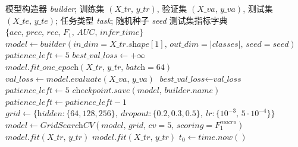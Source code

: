 \begin{algorithm}
  \caption{模型训练与评估循环}
  \label{alg:train-evaluate}
  \small
  \begin{algorithmic}
    \REQUIRE 模型构造器 \textit{builder}; 训练集 $(\textit{X\_tr},\, \textit{y\_tr})$,
             验证集 $(\textit{X\_va},\, \textit{y\_va})$,
             测试集 $(\textit{X\_te},\, \textit{y\_te})$; 任务类型 \textit{task}; 随机种子 \textit{seed}
    \ENSURE 测试集指标字典 $\{\textit{acc},\, \textit{prec},\, \textit{rec},\, F_1,\, \textit{AUC},\, \textit{infer\_time}\}$
    \STATE {}
    \STATE $\textit{model} \gets \textit{builder}(\textit{in\_dim}=\textit{X\_tr}.\textit{shape}[1],\, \textit{out\_dim}=|\textit{classes}|,\, \textit{seed}=\textit{seed})$
      \STATE {}
      \STATE $\textit{patience\_left} \gets 5$
      \STATE $\textit{best\_val\_loss} \gets +\infty$
        \STATE $\textit{model.fit\_one\_epoch}(\textit{X\_tr},\, \textit{y\_tr},\, \textit{batch}=64)$
        \STATE $\textit{val\_loss} \gets \textit{model.evaluate}(\textit{X\_va},\, \textit{y\_va})$
          \STATE $\textit{best\_val\_loss} \gets \textit{val\_loss}$
          \STATE $\textit{patience\_left} \gets 5$
          \STATE $\textit{checkpoint.save}(\textit{model},\, \textit{builder.name})$
        \ELSE
          \STATE $\textit{patience\_left} \gets \textit{patience\_left} - 1$
        \ENDIF
      \ENDWHILE
    \ELSE
        \STATE {}
        \STATE $\textit{grid} \gets \{\textit{hidden}\!:\!\{64,128,256\},\ \textit{dropout}\!:\!\{0.2,0.3,0.5\},\ \textit{lr}\!:\!\{10^{-3},\, 5\!\cdot\!10^{-4}\}\}$
        \STATE $\textit{model} \gets \textit{GridSearchCV}(\textit{model},\, \textit{grid},\, cv=5,\, \textit{scoring}=F_1^{\textit{macro}})$
        \STATE $\textit{model.fit}(\textit{X\_tr},\, \textit{y\_tr})$
      \ELSE
        \STATE {}
        \STATE $\textit{model.fit}(\textit{X\_tr},\, \textit{y\_tr})$
      \ENDIF
    \ENDIF
    \STATE {}
    \STATE $\textit{t}_0 \gets \textit{time.now}()$

\end{algorithmic}
\end{algorithm}
